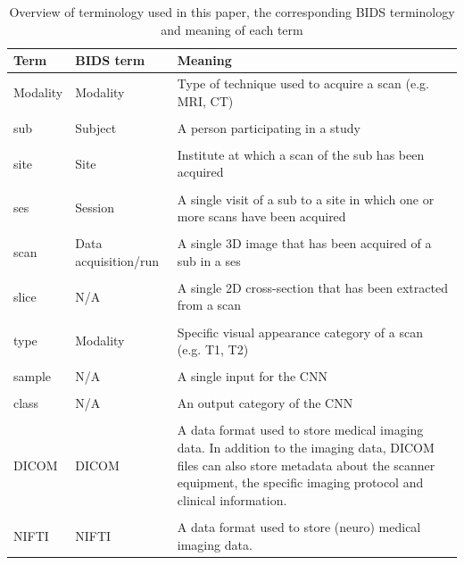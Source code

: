 \begin{table}[htbp]
  \centering

  \begin{tabular}{L{1.5cm}L{3cm}L{6cm}}
  \toprule
  \textbf{Term} & \textbf{\gls{BIDS} term} & \textbf{Meaning}\\
  \midrule
  Modality & Modality & Type of technique used to acquire a \gls{scan} (e.g. \gls{MRI}, \gls{CT})\\
  \\
  \Gls{sub} & Subject & A person participating in a study\\
  \\
  \Gls{site} & Site & Institute at which a \gls{scan} of the \gls{sub} has been acquired\\
  \\
  \Gls{ses} & Session & A single visit of a \gls{sub} to a \gls{site} in which one or more \glspl{scan} have been acquired\\
  \\
  \Gls{scan} & Data acquisition/run & A single 3D image that has been acquired of a \gls{sub} in a \gls{ses}\\
  \\
  \Gls{slice} & N/A & A single 2D cross-section that has been extracted from a \gls{scan}\\
  \\
  \Gls{type} & Modality & Specific visual appearance category of a \gls{scan} (e.g. \gls{T1}, \gls{T2})\\
  \\
  \Gls{sample} & N/A & A single input for the \gls{CNN}\\
  \\
  \Gls{class} & N/A & An output category of the \gls{CNN}\\
  \\
  \acrshort{DICOM} & \acrshort{DICOM} & A data format used to store medical imaging data. In addition to the imaging data, \acrshort{DICOM} files can also store metadata about the scanner equipment, the specific imaging protocol and clinical information.\\
  \\
  \acrshort{NIFTI} & \acrshort{NIFTI} & A data format used to store (neuro) medical imaging data.\\
  \bottomrule
  \end{tabular}
  \caption{Overview of terminology used in this paper, the corresponding \gls{BIDS} terminology and meaning of each term}\label{tab:terminology}
\end{table}



